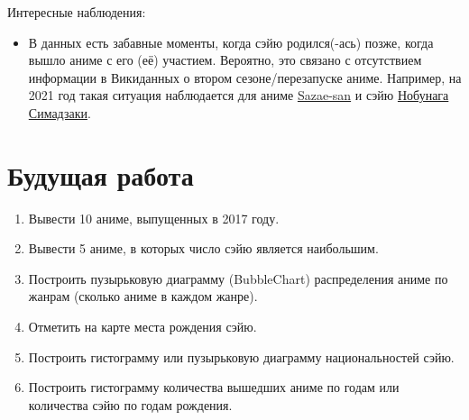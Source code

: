 Интересные наблюдения:
\begin{itemize}
    \item В данных есть забавные моменты, когда сэйю родился(-ась) позже, когда вышло аниме с его (её) участием. Вероятно, это связано с отсутствием информации в Викиданных о втором сезоне/перезапуске аниме. Например, на 2021 год такая ситуация наблюдается для аниме \href{https://www.wikidata.org/wiki/Q11304591}{Sazae-san} и сэйю \href{https://www.wikidata.org/wiki/Q5968283}{Нобунага Симадзаки}.
\end{itemize}

\section{Будущая работа}

\begin{enumerate}
    \item Вывести 10 аниме, выпущенных в 2017 году.
    \item Вывести 5 аниме, в которых число сэйю является наибольшим.
    \item Построить пузырьковую диаграмму (BubbleChart) распределения аниме по жанрам (сколько аниме в каждом жанре).
    \item Отметить на карте места рождения сэйю.
    \item Построить гистограмму или пузырьковую диаграмму национальностей сэйю.
    \item Построить гистограмму количества вышедших аниме по годам или количества сэйю по годам рождения.
\end{enumerate}